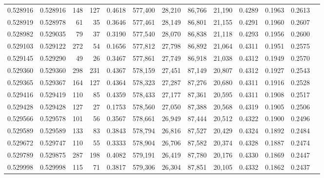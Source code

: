 \begin{tabular}{rrrrrrrrrrrrr}
0.528916 & 0.528916 &   148 &   127 &                                     0.4618 & 577,400 &  28,210 &  86,766 &  21,190 & 0.4289 & 0.1963 & 0.2613 \\
0.528919 & 0.528978 &    61 &    35 &                                     0.3646 & 577,461 &  28,149 &  86,801 &  21,155 & 0.4291 & 0.1960 & 0.2607 \\
0.528982 & 0.529035 &    79 &    37 &                                     0.3190 & 577,540 &  28,070 &  86,838 &  21,118 & 0.4293 & 0.1956 & 0.2600 \\
0.529103 & 0.529122 &   272 &    54 &                                     0.1656 & 577,812 &  27,798 &  86,892 &  21,064 & 0.4311 & 0.1951 & 0.2575 \\
0.529145 & 0.529290 &    49 &    26 &                                     0.3467 & 577,861 &  27,749 &  86,918 &  21,038 & 0.4312 & 0.1949 & 0.2570 \\
0.529360 & 0.529360 &   298 &   231 &                                     0.4367 & 578,159 &  27,451 &  87,149 &  20,807 & 0.4312 & 0.1927 & 0.2543 \\
0.529365 & 0.529367 &   164 &   127 &                                     0.4364 & 578,323 &  27,287 &  87,276 &  20,680 & 0.4311 & 0.1916 & 0.2528 \\
0.529416 & 0.529419 &   110 &    85 &                                     0.4359 & 578,433 &  27,177 &  87,361 &  20,595 & 0.4311 & 0.1908 & 0.2517 \\
0.529428 & 0.529428 &   127 &    27 &                                     0.1753 & 578,560 &  27,050 &  87,388 &  20,568 & 0.4319 & 0.1905 & 0.2506 \\
0.529566 & 0.529578 &   101 &    56 &                                     0.3567 & 578,661 &  26,949 &  87,444 &  20,512 & 0.4322 & 0.1900 & 0.2496 \\
0.529589 & 0.529589 &   133 &    83 &                                     0.3843 & 578,794 &  26,816 &  87,527 &  20,429 & 0.4324 & 0.1892 & 0.2484 \\
0.529672 & 0.529747 &   110 &    55 &                                     0.3333 & 578,904 &  26,706 &  87,582 &  20,374 & 0.4328 & 0.1887 & 0.2474 \\
0.529789 & 0.529875 &   287 &   198 &                                     0.4082 & 579,191 &  26,419 &  87,780 &  20,176 & 0.4330 & 0.1869 & 0.2447 \\
0.529998 & 0.529998 &   115 &    71 &                                     0.3817 & 579,306 &  26,304 &  87,851 &  20,105 & 0.4332 & 0.1862 & 0.2437 \\

\end{tabular}

